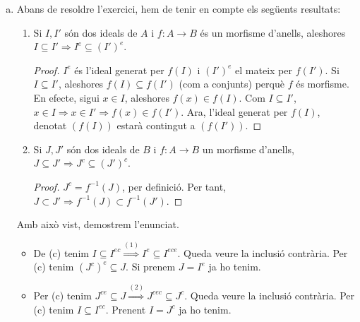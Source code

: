 \documentclass[../main.tex]{subfiles}
\begin{document}
\begin{sol}
\begin{enumerate}[(a)]
    
    \item Abans de resoldre l'exercici, hem de tenir en compte els següents resultats:
    \begin{enumerate}[(1)]
        \item Si $I,I'$ són dos ideals de $A$ i $f:A\rightarrow B$ és un morfisme d'anells, aleshores $I\subseteq I'\Rightarrow I^{e}\subseteq (I')^{e}$.
        \begin{proof}
        $I^{e}$ és l'ideal generat per $f(I)$ i $(I')^{e}$ el mateix per $f(I')$. Si $I\subseteq I'$, aleshores $f(I)\subseteq f(I')$ (com a conjunts) perquè $f$ és morfisme. En efecte, sigui $x\in I$, aleshores $f(x)\in f(I)$. Com $I\subseteq I'$, $x\in I\Rightarrow x\in I'\Rightarrow f(x)\in f(I')$. Ara, l'ideal generat per $f(I)$, denotat $(f(I))$ estarà contingut a $(f(I'))$.
        \end{proof}
        \item Si $J,J'$ són dos ideals de $B$ i $f:A\rightarrow B$ un morfisme d'anells, $J\subseteq J'\Rightarrow J^c\subseteq (J')^c$.
        \begin{proof}
            $J^c= f^{-1}(J)$, per definició. Per tant, $J\subset J'\Rightarrow f^{-1}(J)\subset f^{-1}(J')$.
        \end{proof}
    \end{enumerate}
    Amb això vist, demostrem l'enunciat.
    \begin{itemize}
        \item {} De (c) tenim $I\subseteq I^{ec}\overset{(1)}{\Longrightarrow} I^{e}\subseteq I^{ece}$. Queda veure la inclusió contrària. Per (c) tenim $(J^c)^{e}\subseteq J$. Si prenem $J=I^{e}$ ja ho tenim. 
        \item {} Per (c) tenim $J^{ce}\subseteq J\overset{(2)}{\Longrightarrow} J^{cec}\subseteq J^c$. Queda veure la inclusió contrària. Per (c) tenim $I\subseteq I^{ec}$. Prenent $I=J^c$ ja ho tenim.
    \end{itemize}
\end{enumerate}
\end{sol}
\end{document}
